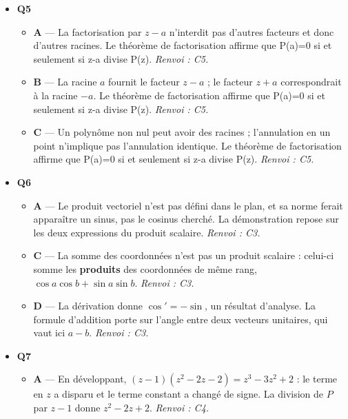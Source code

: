 \begin{itemize}
\begin{itemize}
    \item \textbf{B} — Racines réelles uniquement. L'équation z\textasciicircum{}n=1 possède exactement les n solutions exp(2ikpi/n), pour k de 0 à n-1. \emph{Renvoi : C7.}
    \item \textbf{D} — Compte incorrect. L'équation z\textasciicircum{}n=1 possède exactement les n solutions exp(2ikpi/n), pour k de 0 à n-1. \emph{Renvoi : C7.}
  \end{itemize}
  \item \textbf{Q5}
  \begin{itemize}
    \item \textbf{A} — La factorisation par $z-a$ n'interdit pas d'autres facteurs et donc d'autres racines. Le théorème de factorisation affirme que P(a)=0 si et seulement si z-a divise P(z). \emph{Renvoi : C5.}
    \item \textbf{B} — La racine $a$ fournit le facteur $z-a$ ; le facteur $z+a$ correspondrait à la racine $-a$. Le théorème de factorisation affirme que P(a)=0 si et seulement si z-a divise P(z). \emph{Renvoi : C5.}
    \item \textbf{C} — Un polynôme non nul peut avoir des racines ; l'annulation en un point n'implique pas l'annulation identique. Le théorème de factorisation affirme que P(a)=0 si et seulement si z-a divise P(z). \emph{Renvoi : C5.}
  \end{itemize}
  \item \textbf{Q6}
  \begin{itemize}
    \item \textbf{A} — Le produit vectoriel n'est pas défini dans le plan, et sa norme ferait apparaître un sinus, pas le cosinus cherché. La démonstration repose sur les deux expressions du produit scalaire. \emph{Renvoi : C3.}
    \item \textbf{C} — La somme des coordonnées n'est pas un produit scalaire : celui-ci somme les \textbf{produits} des coordonnées de même rang, $\cos a\cos b+\sin a\sin b$. \emph{Renvoi : C3.}
    \item \textbf{D} — La dérivation donne $\cos'=-\sin$, un résultat d'analyse. La formule d'addition porte sur l'angle entre deux vecteurs unitaires, qui vaut ici $a-b$. \emph{Renvoi : C3.}
  \end{itemize}
  \item \textbf{Q7}
  \begin{itemize}
    \item \textbf{A} — En développant, $(z-1)(z^2-2z-2)=z^3-3z^2+2$ : le terme en $z$ a disparu et le terme constant a changé de signe. La division de $P$ par $z-1$ donne $z^2-2z+2$. \emph{Renvoi : C4.}

\end{itemize}
\end{itemize}
